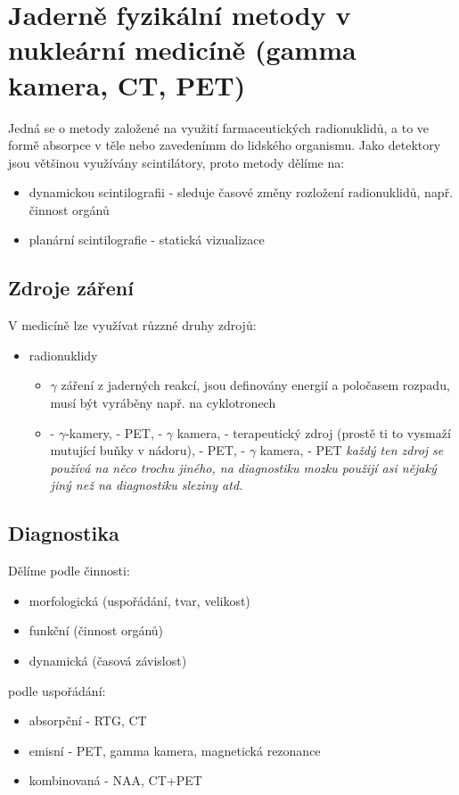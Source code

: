 \newpage
\section{Jaderně fyzikální metody v nukleární medicíně (gamma kamera, CT, PET)}
Jedná se o metody založené na využití farmaceutických radionuklidů, a to ve formě absorpce v těle nebo zavedenímm do lidského organismu. Jako detektory jsou většinou využívány scintilátory, proto metody dělíme na:
\begin{itemize}
    \item dynamickou scintilografii - sleduje časové změny rozložení radionuklidů, např. činnost orgánů
    \item planární scintilografie - statická vizualizace
\end{itemize}
\subsection{Zdroje záření}
V medicíně lze využívat růzzné druhy zdrojů:

\begin{itemize}
    \item radionuklidy 
    \begin{itemize}
        \item $\gamma$ záření z jaderných reakcí, jsou definovány energií a poločasem rozpadu, musí být vyráběny např. na cyklotronech
        \item {} - $\gamma$-kamery,  - PET,  - $\gamma$ kamera,  - terapeutický zdroj (prostě ti to vysmaží mutující buňky v nádoru),  - PET,  - $\gamma$ kamera,  - PET \textit{každý ten zdroj se používá na něco trochu jiného, na diagnostiku mozku použijí asi nějaký jiný než na diagnostiku sleziny atd.}
        
    \end{itemize}
\end{itemize}

\subsection{Diagnostika}

Dělíme podle činnosti:
\begin{itemize}
    \item morfologická (uspořádání, tvar, velikost)
    \item funkční (činnost orgánů)
    \item dynamická (časová závislost)
\end{itemize}
podle uspořádání:
\begin{itemize}
    \item absorpční - RTG, CT
    \item emisní - PET, gamma kamera, magnetická rezonance
    \item kombinovaná - NAA, CT+PET
    
\end{itemize}

